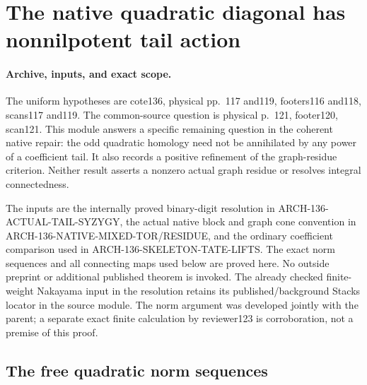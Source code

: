 \section{The native quadratic diagonal has nonnilpotent tail action}
\label{sec:136-quadratic-tail-action}

\paragraph{Archive, inputs, and exact scope.}
The uniform hypotheses are cote136, physical pp.~117 and119,
footers116 and118, scans117 and119.  The common-source question
is physical p.~121, footer120, scan121.  This module answers a
specific remaining question in the coherent native repair: the
odd quadratic homology need not be annihilated by any power of
a coefficient tail.  It also records a positive refinement of
the graph-residue criterion.  Neither result asserts a nonzero
actual graph residue or resolves integral connectedness.

The inputs are the internally proved binary-digit resolution in
ARCH-136-ACTUAL-TAIL-SYZYGY, the actual native block and graph
cone convention in ARCH-136-NATIVE-MIXED-TOR/RESIDUE, and the
ordinary coefficient comparison used in
ARCH-136-SKELETON-TATE-LIFTS.  The exact norm sequences and all
connecting maps used below are proved here.  No outside preprint
or additional published theorem is invoked.  The already checked
finite-weight Nakayama input in the resolution retains its
published/background Stacks locator in the source module.
The norm argument was developed jointly with the parent; a
separate exact finite calculation by reviewer123 is corroboration,
not a premise of this proof.

\subsection{The free quadratic norm sequences}

